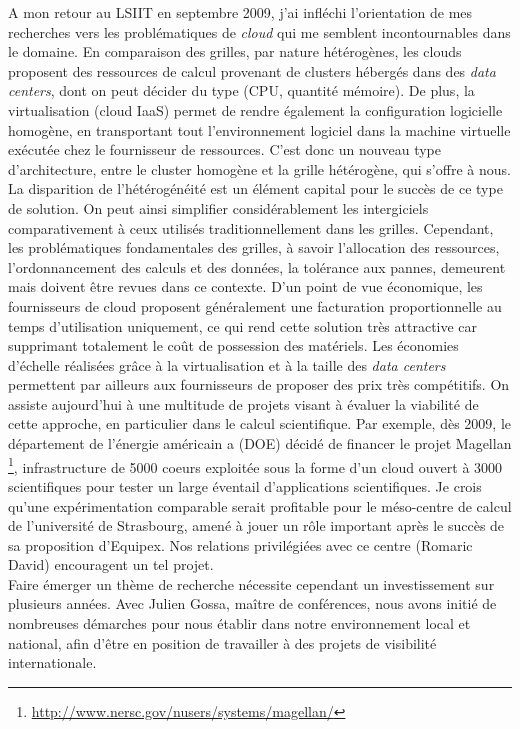 \documentclass[11pt]{article}
\begin{document}
A mon retour au LSIIT en septembre 2009, j'ai infléchi l'orientation de 
mes recherches vers les problématiques de \emph{cloud} qui me semblent 
incontournables dans le domaine. En comparaison des grilles, par nature
hétérogènes, les clouds proposent des ressources de calcul provenant
de clusters hébergés dans des \textit{data centers}, dont on peut décider 
du type (CPU, quantité mémoire).  De plus, la virtualisation (cloud IaaS) 
permet de rendre également la configuration logicielle homogène, en 
transportant tout l'environnement logiciel dans la machine virtuelle exécutée 
chez le fournisseur de ressources. C'est donc un nouveau type d'architecture, 
entre le cluster homogène et la grille hétérogène, qui s'offre à nous. 
La disparition de l'hétérogénéité est un élément capital pour le succès
de ce type de solution. On peut ainsi simplifier considérablement les 
intergiciels comparativement à ceux utilisés traditionnellement dans les 
grilles. Cependant, les problématiques fondamentales des grilles, à
savoir l'allocation des ressources, l'ordonnancement des calculs et des
données, la tolérance aux pannes, demeurent mais doivent être revues 
dans ce contexte.
D'un point de vue économique, les fournisseurs de cloud proposent 
généralement une facturation proportionnelle au temps d'utilisation 
uniquement, ce qui rend cette solution très attractive car supprimant
totalement le coût de possession des matériels. Les économies d'échelle
réalisées grâce à la virtualisation et à la taille des \textit{data centers}
permettent par ailleurs aux fournisseurs de proposer des prix très 
compétitifs.  On assiste aujourd'hui à une multitude de projets visant 
à évaluer la viabilité de cette approche, en particulier dans le calcul 
scientifique. Par exemple, dès 2009, le département de l'énergie américain 
a (DOE) décidé de financer le projet Magellan%
\footnote{\url{http://www.nersc.gov/nusers/systems/magellan/}},
infrastructure de 5000 coeurs exploitée sous la forme d'un cloud
ouvert à 3000 scientifiques pour tester un large éventail 
d'applications scientifiques. Je crois qu'une expérimentation comparable
serait profitable pour le méso-centre de calcul de l'université de
Strasbourg, amené à jouer un rôle important après le succès de sa 
proposition d'Equipex. Nos relations privilégiées avec ce centre (Romaric 
David) encouragent un tel projet.\\

Faire émerger un thème de recherche nécessite cependant un investissement 
sur plusieurs années. Avec Julien Gossa, maître de conférences, nous avons 
initié de nombreuses démarches pour nous établir dans notre environnement 
local et national, afin d'être en position de travailler à des projets
de visibilité internationale. 
\end{document}
